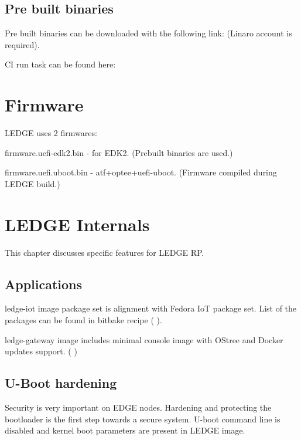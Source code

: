 \documentclass[a4paper,10pt,oneside,english]{sphinxmanual}
\begin{document}
\section{Pre built binaries}
\label{\detokenize{chapter2-oe:pre-built-binaries}}
Pre built binaries can be downloaded with the following link:
(Linaro account is required).

CI run task can be found here: 


\chapter{Firmware}
\label{\detokenize{chapter3-firmware:firmware}}\label{\detokenize{chapter3-firmware::doc}}
LEDGE uses 2  firmwares:

firmware.uefi-edk2.bin - for EDK2. (Prebuilt binaries are used.)

firmware.uefi.uboot.bin - atf+optee+uefi-uboot. (Firmware compiled during LEDGE build.)


\chapter{LEDGE Internals}
\label{\detokenize{chapter4-internals:ledge-internals}}\label{\detokenize{chapter4-internals::doc}}
This chapter discusses specific features for LEDGE RP.


\section{Applications}
\label{\detokenize{chapter4-internals:applications}}
ledge-iot image package set is alignment with Fedora IoT package set. List of the packages can be found in bitbake recipe (  ).

ledge-gateway image includes minimal console image with OStree and Docker updates support. (  )


\section{U-Boot hardening}
\label{\detokenize{chapter4-internals:u-boot-hardening}}
Security is very important on EDGE nodes. Hardening and protecting the bootloader is the first step towards a secure system. U-boot command line is disabled and kernel boot parameters are present in LEDGE image.
\end{document}
